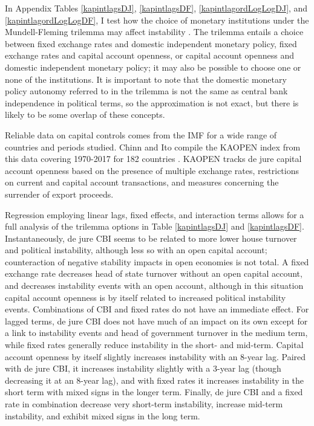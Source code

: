 \documentclass{article}
\begin{document}
    In Appendix Tables \ref*{kapintlagsDJ}, \ref*{kapintlagsDF}, \ref*{kapintlagordLogLogDJ}, and \ref*{kapintlagordLogLogDF}, I test how the choice of monetary institutions under the Mundell-Fleming trilemma may affect instability \citep{fleming_domestic_1962,mundell_capital_1963}. The trilemma entails a choice between fixed exchange rates and domestic independent monetary policy, fixed exchange rates and capital account openness, or capital account openness and domestic independent monetary policy; it may also be possible to choose one or none of the institutions. It is important to note that the domestic monetary policy autonomy referred to in the trilemma is not the same as central bank independence in political terms, so the approximation is not exact, but there is likely to be some overlap of these concepts.

    Reliable data on capital controls comes from the IMF for a wide range of countries and periods studied. Chinn and Ito compile the KAOPEN index from this data covering 1970-2017 for 182 countries \citep{chinn_what_2005}. KAOPEN tracks de jure capital account openness based on the presence of multiple exchange rates, restrictions on current and capital account transactions, and measures concerning the surrender of export proceeds.

    Regression employing linear lags, fixed effects, and interaction terms allows for a full analysis of the trilemma options in Table \ref*{kapintlagsDJ} and \ref*{kapintlagsDF}. Instantaneously, de jure CBI seems to be related to more lower house turnover and political instability, although less so with an open capital account; counteraction of negative stability impacts in open economies is not total. A fixed exchange rate decreases head of state turnover without an open capital account, and decreases instability events with an open account, although in this situation capital account openness is by itself related to increased political instability events. Combinations of CBI and fixed rates do not have an immediate effect. For lagged terms, de jure CBI does not have much of an impact on its own except for a link to instability events and head of government turnover in the medium term, while fixed rates generally reduce instability in the short- and mid-term. Capital account openness by itself slightly increases instability with an 8-year lag. Paired with de jure CBI, it increases instability slightly with a 3-year lag (though decreasing it at an 8-year lag), and with fixed rates it increases instability in the short term with mixed signs in the longer term. Finally, de jure CBI and a fixed rate in combination decrease very short-term instability, increase mid-term instability, and exhibit mixed signs in the long term.
\end{document}
